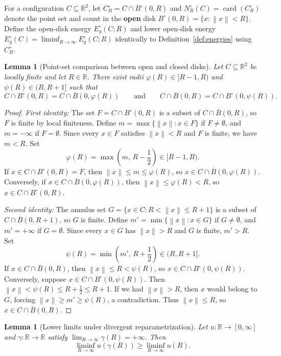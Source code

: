 \documentclass[11pt, a4paper]{article}
\newtheorem{lemma}[theorem]{Lemma}
\theoremstyle{definition}
\theoremstyle{remark}
\newcommand{\R}{\mathbb{R}}
\newcommand{\Bbar}{\overline{B}}
\newcommand{\Bopen}{B^{\circ}}
\newcommand{\norm}[1]{\left\lVert #1 \right\rVert}
\begin{document}
For a configuration $C \subseteq \R^2$, let $C_R^{\circ} = C \cap \Bopen(0, R)$ and $N_R^{\circ}(C) = \operatorname{card}(C_R^{\circ})$ denote the point set and count in the \textbf{open} disk $\Bopen(0, R) = \{x : \norm{x} < R\}$. Define the open-disk energy $E_g^{\circ}(C; R)$ and lower open-disk energy $E_g^{\circ}(C) = \liminf_{R \to \infty} E_g^{\circ}(C; R)$ identically to Definition~\ref{def:energies} using $C_R^{\circ}$.

\begin{lemma}[Point-set comparison between open and closed disks]
\label{lem:open_closed_sets}
Let $C \subseteq \R^2$ be locally finite and let $R \in \R$. There exist radii $\varphi(R) \in [R - 1, R)$ and $\psi(R) \in (R, R + 1]$ such that
\[
C \cap \Bopen(0, R) = C \cap \Bbar(0, \varphi(R)) \qquad \text{and} \qquad C \cap \Bbar(0, R) = C \cap \Bopen(0, \psi(R)).
\]
\end{lemma}

\begin{proof}
\textit{First identity:} The set $F = C \cap \Bopen(0, R)$ is a subset of $C \cap \Bbar(0, R)$, so $F$ is finite by local finiteness. Define $m = \max\{\norm{x} : x \in F\}$ if $F \neq \emptyset$, and $m = -\infty$ if $F = \emptyset$. Since every $x \in F$ satisfies $\norm{x} < R$ and $F$ is finite, we have $m < R$. Set
\[
\varphi(R) = \max\left(m, \, R - \frac{1}{2}\right) \in [R - 1, R).
\]
If $x \in C \cap \Bopen(0, R) = F$, then $\norm{x} \le m \le \varphi(R)$, so $x \in C \cap \Bbar(0, \varphi(R))$. Conversely, if $x \in C \cap \Bbar(0, \varphi(R))$, then $\norm{x} \le \varphi(R) < R$, so $x \in C \cap \Bopen(0, R)$.

\noindent \textit{Second identity:} The annulus set $G = \{x \in C : R < \norm{x} \le R + 1\}$ is a subset of $C \cap \Bbar(0, R + 1)$, so $G$ is finite. Define $m' = \min\{\norm{x} : x \in G\}$ if $G \neq \emptyset$, and $m' = +\infty$ if $G = \emptyset$. Since every $x \in G$ has $\norm{x} > R$ and $G$ is finite, $m' > R$. Set
\[
\psi(R) = \min\left(m', \, R + \frac{1}{2}\right) \in (R, R + 1].
\]
If $x \in C \cap \Bbar(0, R)$, then $\norm{x} \le R < \psi(R)$, so $x \in C \cap \Bopen(0, \psi(R))$. Conversely, suppose $x \in C \cap \Bopen(0, \psi(R))$. Then $\norm{x} < \psi(R) \le R + \frac{1}{2} \le R + 1$. If we had $\norm{x} > R$, then $x$ would belong to $G$, forcing $\norm{x} \ge m' \ge \psi(R)$, a contradiction. Thus $\norm{x} \le R$, so $x \in C \cap \Bbar(0, R)$.
\end{proof}

\begin{lemma}[Lower limits under divergent reparametrization]
\label{lem:liminf_reparam}
Let $u : \R \to [0, \infty]$ and $\gamma : \R \to \R$ satisfy $\lim_{R \to \infty} \gamma(R) = +\infty$. Then
\[
\liminf_{R \to \infty} u(\gamma(R)) \ge \liminf_{R \to \infty} u(R).
\]
\end{lemma}
\end{document}

